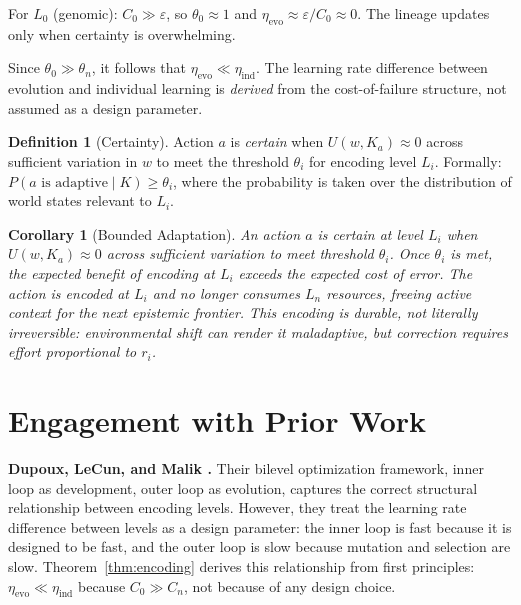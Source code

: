 \documentclass[11pt]{article}
\newtheorem{corollary}[theorem]{Corollary}
\theoremstyle{definition}
\newtheorem{definition}{Definition}
\begin{document}
For $L_0$ (genomic): $C_0 \gg \varepsilon$, so $\theta_0 \approx 1$
and $\eta_{\mathrm{evo}} \approx \varepsilon / C_0 \approx 0$. The
lineage updates only when certainty is overwhelming.

Since $\theta_0 \gg \theta_n$, it follows that
$\eta_{\mathrm{evo}} \ll \eta_{\mathrm{ind}}$. The learning rate
difference between evolution and individual learning is \emph{derived}
from the cost-of-failure structure, not assumed as a design parameter.

\begin{definition}[Certainty]
\label{def:certain}
Action $a$ is \emph{certain} when $U(w, K_a) \approx 0$ across
sufficient variation in $w$ to meet the threshold $\theta_i$ for
encoding level $L_i$. Formally: $P(\text{$a$ is adaptive} \mid K)
\geq \theta_i$, where the probability is taken over the distribution
of world states relevant to $L_i$.
\end{definition}

\begin{corollary}[Bounded Adaptation]
\label{cor:bounded}
An action $a$ is \emph{certain} at level $L_i$ when $U(w, K_a)
\approx 0$ across sufficient variation to meet threshold $\theta_i$.
Once $\theta_i$ is met, the expected benefit of encoding at $L_i$
exceeds the expected cost of error. The action is encoded at $L_i$ and
no longer consumes $L_n$ resources, freeing active context for the
next epistemic frontier. This encoding is durable, not literally
irreversible: environmental shift can render it maladaptive, but
correction requires effort proportional to $r_i$.
\end{corollary}

\section{Engagement with Prior Work}
\label{sec:prior}

\textbf{Dupoux, LeCun, and Malik \cite{DupouxLeCunMalik2026}.}
Their bilevel optimization framework, inner loop as development,
outer loop as evolution, captures the correct structural
relationship between encoding levels. However, they treat the learning
rate difference between levels as a design parameter: the inner loop
is fast because it is designed to be fast, and the outer loop is slow
because mutation and selection are slow. Theorem~\ref{thm:encoding}
derives this relationship from first principles: $\eta_{\mathrm{evo}}
\ll \eta_{\mathrm{ind}}$ because $C_0 \gg C_n$, not because of any
design choice.
\end{document}
